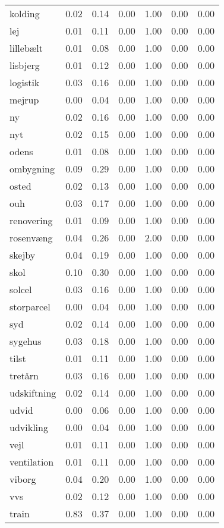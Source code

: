 \begin{landscape}
\begin{longtable}[h!]{lllllll}
kolding & 0.02 & 0.14 & 0.00 & 1.00 & 0.00 & 0.00 \\
lej & 0.01 & 0.11 & 0.00 & 1.00 & 0.00 & 0.00 \\
lillebælt & 0.01 & 0.08 & 0.00 & 1.00 & 0.00 & 0.00 \\
lisbjerg & 0.01 & 0.12 & 0.00 & 1.00 & 0.00 & 0.00 \\
logistik & 0.03 & 0.16 & 0.00 & 1.00 & 0.00 & 0.00 \\
mejrup & 0.00 & 0.04 & 0.00 & 1.00 & 0.00 & 0.00 \\
ny & 0.02 & 0.16 & 0.00 & 1.00 & 0.00 & 0.00 \\
nyt & 0.02 & 0.15 & 0.00 & 1.00 & 0.00 & 0.00 \\
odens & 0.01 & 0.08 & 0.00 & 1.00 & 0.00 & 0.00 \\
ombygning & 0.09 & 0.29 & 0.00 & 1.00 & 0.00 & 0.00 \\
osted & 0.02 & 0.13 & 0.00 & 1.00 & 0.00 & 0.00 \\
ouh & 0.03 & 0.17 & 0.00 & 1.00 & 0.00 & 0.00 \\
renovering & 0.01 & 0.09 & 0.00 & 1.00 & 0.00 & 0.00 \\
rosenvæng & 0.04 & 0.26 & 0.00 & 2.00 & 0.00 & 0.00 \\
skejby & 0.04 & 0.19 & 0.00 & 1.00 & 0.00 & 0.00 \\
skol & 0.10 & 0.30 & 0.00 & 1.00 & 0.00 & 0.00 \\
solcel & 0.03 & 0.16 & 0.00 & 1.00 & 0.00 & 0.00 \\
storparcel & 0.00 & 0.04 & 0.00 & 1.00 & 0.00 & 0.00 \\
syd & 0.02 & 0.14 & 0.00 & 1.00 & 0.00 & 0.00 \\
sygehus & 0.03 & 0.18 & 0.00 & 1.00 & 0.00 & 0.00 \\
tilst & 0.01 & 0.11 & 0.00 & 1.00 & 0.00 & 0.00 \\
tretårn & 0.03 & 0.16 & 0.00 & 1.00 & 0.00 & 0.00 \\
udskiftning & 0.02 & 0.14 & 0.00 & 1.00 & 0.00 & 0.00 \\
udvid & 0.00 & 0.06 & 0.00 & 1.00 & 0.00 & 0.00 \\
udvikling & 0.00 & 0.04 & 0.00 & 1.00 & 0.00 & 0.00 \\
vejl & 0.01 & 0.11 & 0.00 & 1.00 & 0.00 & 0.00 \\
ventilation & 0.01 & 0.11 & 0.00 & 1.00 & 0.00 & 0.00 \\
viborg & 0.04 & 0.20 & 0.00 & 1.00 & 0.00 & 0.00 \\
vvs & 0.02 & 0.12 & 0.00 & 1.00 & 0.00 & 0.00 \\
train & 0.83 & 0.37 & 0.00 & 1.00 & 0.00 & 0.00 \\
\end{longtable}\end{landscape}
